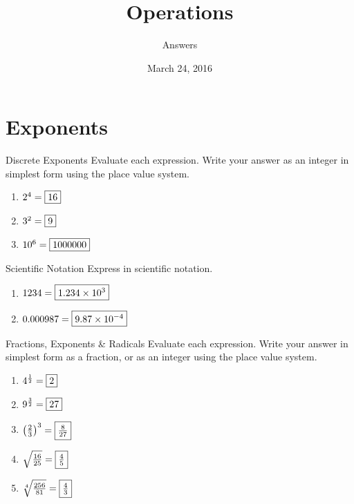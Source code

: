 \documentclass[12pt,letterpaper]{article}
\title{Operations}
\author{Answers}
\date{March 24, 2016}
\begin{document}
\maketitle

\section{Exponents}

\begin{problem}{Discrete Exponents}
 Evaluate each expression. Write your answer as an integer in simplest form
 using the place value system.

 \begin{enumerate}[\hspace{.5cm}a.]
  \item $2^4=\framebox{$16$}$
  \item $3^2=\framebox{$9$}$
  \item $10^6=\framebox{$1000000$}$
 \end{enumerate}
\end{problem}

\begin{problem}{Scientific Notation}
 Express in scientific notation.

 \begin{enumerate}[\hspace{.5cm}a.]
  \item \( 1234=\framebox{$1.234\times{10}^3$} \)
  \item \( 0.000987=\framebox{$9.87\times{10}^{-4}$} \)
 \end{enumerate}
\end{problem}

\begin{problem}{Fractions, Exponents \& Radicals}
 Evaluate each expression. Write your answer in simplest form as a fraction, or
 as an integer using the place value system.

 \begin{enumerate}[\hspace{.5cm}a.]
  \item $4^{\frac{1}{2}}=\framebox{$2$}$
  \item $9^{\frac{3}{2}}=\framebox{$27$}$
  \item ${\left(\frac{2}{3}\right)}^3=\framebox{$\frac{8}{27}$}$
  \item $\sqrt{\frac{16}{25}}=\framebox{$\frac{4}{5}$}$
  \item $\sqrt[4]{\frac{256}{81}}=\framebox{$\frac{4}{3}$}$
 \end{enumerate}
\end{problem}
\end{document}
